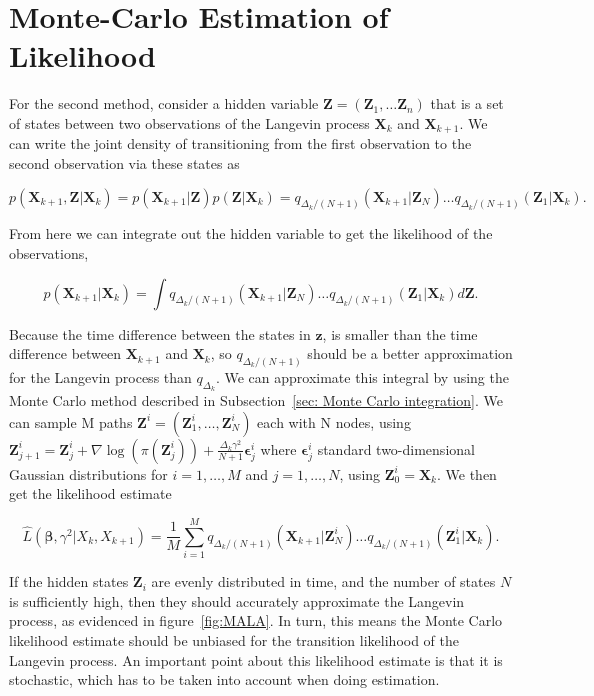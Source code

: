 \section{Monte-Carlo Estimation of Likelihood}
\label{sec: Monte Carlo Estimation}
For the second method, consider a hidden variable $\textbf{Z} = (\textbf{Z}_1, \dots \textbf{Z}_n)$ that is a set of states between two observations of the Langevin process $\textbf{X}_k$ and $\textbf{X}_{k+1}$. We can write the joint density of transitioning from the first observation to the second observation via these states as 

$$p(\textbf{X}_{k+1}, \textbf{Z} | \textbf{X}_k) = p(\textbf{X}_{k+1}|\textbf{Z})p(\textbf{Z}|\textbf{X}_k) = q_{\Delta_k/(N+1)}(\textbf{X}_{k+1}|\textbf{Z}_N)\dots q_{\Delta_k/(N+1)}(\textbf{Z}_1|\textbf{X}_k).
$$ 

From here we can integrate out the hidden variable to get the likelihood of the observations, 


$$p(\textbf{X}_{k+1}|\textbf{X}_k) = \int q_{\Delta_k/(N+1)}(\textbf{X}_{k+1}|\textbf{Z}_N)\dots q_{\Delta_k/(N+1)}(\textbf{Z}_1|\textbf{X}_k)d\textbf{Z}.
$$

Because the time difference between the states in $\textbf{z}$, is smaller than the time difference between $\textbf{X}_{k+1}$ and $\textbf{X}_k$, so $q_{\Delta_k/(N+1)}$ should be a better approximation for the Langevin process than $q_{\Delta_k}$. We can approximate this integral by using the Monte Carlo method described in Subsection~\ref{sec: Monte Carlo integration}. We can sample M paths $\textbf{Z}^i = (\textbf{Z}_1^i, \dots,\textbf{Z}_N^i)$ each with N nodes, using $\textbf{Z}_{j+1}^i = \textbf{Z}_j^i + \nabla \log(\pi(\textbf{Z}_j^i)) + \frac{\Delta_k\gamma^2}{N+1}\bm \epsilon_j^i$ where $\bm \epsilon_j^i$ standard two-dimensional Gaussian distributions for $i=1, \dots , M$ and $j = 1,\dots , N$, using $\textbf{Z}_0^i = \textbf{X}_k$. We then get the likelihood estimate

$$
\hat{L}(\bm \beta , \gamma^2|X_k, X_{k+1}) =  \frac{1}{M}\sum_{i=1}^M q_{\Delta_k/(N+1)}(\textbf{X}_{k+1}|\textbf{Z}^i_N)\dots q_{\Delta_k/(N+1)}(\textbf{Z}^i_1|\textbf{X}_k).
\label{eq: montecarlo likelihood}
$$

If the hidden states $\textbf{Z}_i$ are evenly distributed in time, and the number of states $N$ is sufficiently high, then they should accurately approximate the Langevin process, as evidenced in figure~\ref{fig:MALA}. In turn, this means the Monte Carlo likelihood estimate should be unbiased for the transition likelihood of the Langevin process. An important point about this likelihood estimate is that it is stochastic, which has to be taken into account when doing estimation. 

